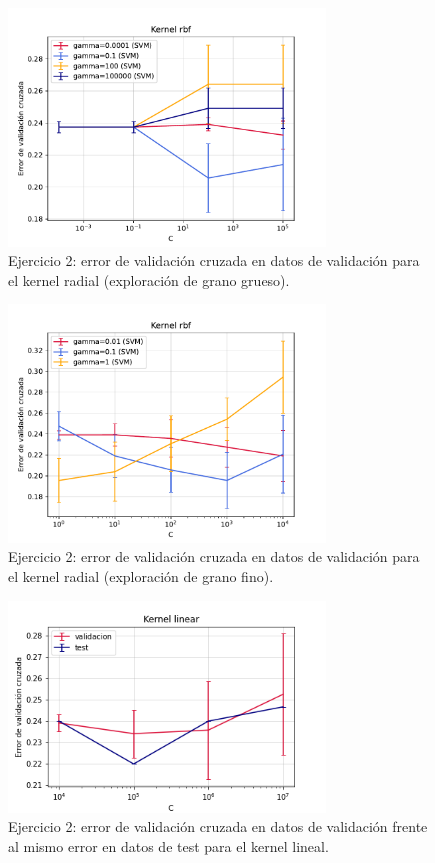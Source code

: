 \documentclass[11pt]{article}
\begin{document}
\begin{figure}[h]
\centering
\includegraphics[width=0.75\textwidth]{fotos/rbf_gg.pdf}
\caption{Ejercicio 2: error de validación cruzada en datos de validación para el kernel radial (exploración de grano grueso).}
\end{figure}

\begin{figure}[h]
\centering
\includegraphics[width=0.75\textwidth]{fotos/radial_gf.pdf}
\caption{Ejercicio 2: error de validación cruzada en datos de validación para el kernel radial (exploración de grano fino).}
\end{figure}

\begin{figure}[h]
\centering
\includegraphics[width=0.75\textwidth]{fotos/linealTest.png}
\caption{Ejercicio 2: error de validación cruzada en datos de validación frente al mismo error en datos de test para el kernel lineal.}
\end{figure}
\end{document}
